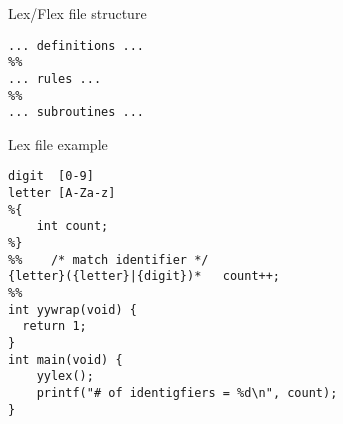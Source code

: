 \documentclass{prosper}%
\begin{document}
\begin{slide}{Lex/Flex file structure}
\begin{center}
\begin{verbatim}
... definitions ... 
%% 
... rules ... 
%% 
... subroutines ... 
\end{verbatim} 
\end{center}
\end{slide}

\begin{slide}{Lex file example}
\begin{verbatim}
digit  [0-9] 
letter [A-Za-z] 
%{ 
    int count; 
%} 
%%    /* match identifier */ 
{letter}({letter}|{digit})*   count++; 
%% 
int yywrap(void) { 
  return 1;
}
int main(void) { 
    yylex(); 
    printf("# of identigfiers = %d\n", count); 
} 
\end{verbatim}
\end{slide}
\end{document}
